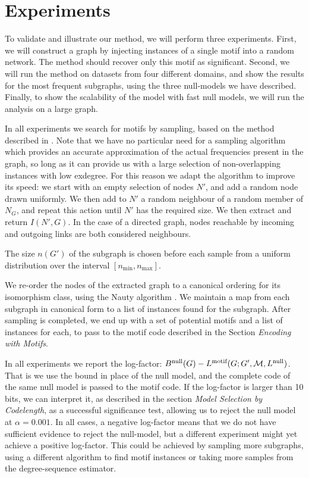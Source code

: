\section*{Experiments}

To validate and illustrate our method, we will perform three experiments. First, we will construct a graph by injecting instances of a single motif into a random network. The method should recover only this motif as significant. Second, we will run the method on datasets from four different domains, and show the results for the most frequent subgraphs, using the three null-models we have described. Finally, to show the scalability of the model with fast null models, we will run the analysis on a large graph.

In all experiments we search for motifs by sampling, based on the method described in \cite{kashtan2004efficient}. Note that we have no particular need for a sampling algorithm which provides an accurate approximation of the actual frequencies present in the graph, so long as it can provide us with a large selection of non-overlapping instances with low exdegree. For this reason we adapt the algorithm to improve its speed: we start with an empty selection of nodes $N'$, and add a random node drawn uniformly. We then add to $N'$ a random neighbour of a random member of $N_G$, and repeat this action until $N'$ has the required size. We then extract and return $I(N', G)$. In the case of a directed graph, nodes reachable by incoming and outgoing links are both considered neighbours.  

The size $n(G')$ of the subgraph is chosen before each sample from a uniform distribution over the interval $[n_\text{min}, n_\text{max}]$.

We re-order the nodes of the extracted graph to a canonical ordering for its isomorphism class, using the Nauty algorithm \cite{mckay1981practical}. We maintain a map from each  subgraph in canonical form to a list of instances found for the subgraph. After sampling is completed, we end up with a set of potential motifs and a list of instances for each, to pass to the motif code described in the Section \emph{Encoding with Motifs}.

In all experiments we report the log-factor: $B^\text{null}(G) - L^\text{motif}(G; G', {\cal M}, L^\text{null})$. That is we use the bound in place of the null model, and the complete code of the same null model is passed to the motif code. If the log-factor is larger than 10 bits, we can interpret it, as described in the section \emph{Model Selection by Codelength}, as a successful significance test, allowing us to reject the null model at $\alpha=0.001$. In all cases, a negative log-factor means that we do not have sufficient evidence to reject the null-model, but a different experiment might yet achieve a positive log-factor. This could be achieved by sampling more subgraphs, using a different algorithm to find motif instances or taking more samples from the degree-sequence estimator.

